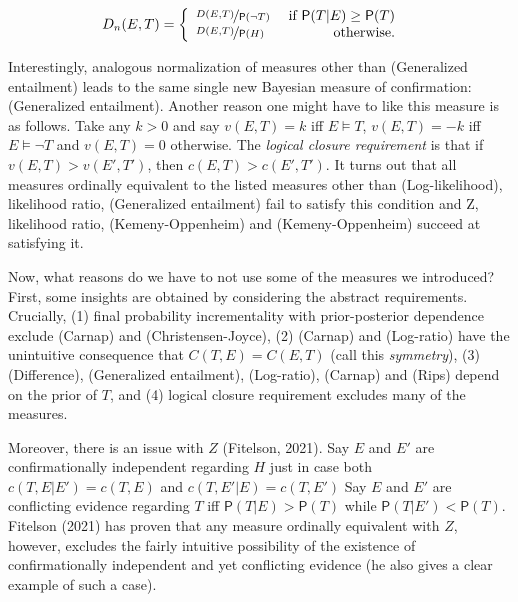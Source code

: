 \documentclass[10pt,dvipsnames,enabledeprecatedfontcommands]{scrartcl}
\newcommand{\n}{\neg}
\newcommand{\pr}[1]{\mathsf{P}(#1)}
\begin{document}
\begin{align*}
D_n(E,T)  & = \left\{ \begin{array}{lr}
\nicefrac{D(E,T)}{\pr{\n T}} & \mbox{ if } \pr{T\vert E} \geq \pr{T}\\
\nicefrac{D(E,T)}{\pr{H}} &\mbox { otherwise.}\\
\end{array} \right.
\end{align*}

Interestingly, analogous normalization of measures other than
(Generalized entailment) leads to the same single new Bayesian measure
of confirmation: (Generalized entailment). Another reason one might have
to like this measure is as follows. Take any \(k > 0\) and say
\(v(E,T) =k\) iff \(E\models T\), \(v(E,T) = -k\) iff \(E \models \n T\)
and \(v(E,T)=0\) otherwise. The \emph{logical closure requirement} is
that if \(v(E,T) > v(E', T')\), then \(c(E, T) > c(E' , T' )\). It turns
out that all measures ordinally equivalent to the listed measures other
than (Log-likelihood), likelihood ratio, (Generalized entailment) fail
to satisfy this condition and Z, likelihood ratio, (Kemeny-Oppenheim)
and (Kemeny-Oppenheim) succeed at satisfying it.

Now, what reasons do we have to not use some of the measures we
introduced? First, some insights are obtained by considering the
abstract requirements. Crucially, (1) final probability incrementality
with prior-posterior dependence exclude (Carnap) and
(Christensen-Joyce), (2) (Carnap) and (Log-ratio) have the unintuitive
consequence that \(C(T,E)= C(E,T)\) (call this \emph{symmetry}), (3)
(Difference), (Generalized entailment), (Log-ratio), (Carnap) and (Rips)
depend on the prior of \(T\), and (4) logical closure requirement
excludes many of the measures.

Moreover, there is an issue with \(Z\) (Fitelson, 2021). Say \(E\) and
\(E'\) are confirmationally independent regarding \(H\) just in case
both \(c(T, E \vert E' ) = c(T, E )\) and
\(c(T, E' \vert E ) = c(T, E')\) Say \(E\) and \(E'\) are conflicting
evidence regarding \(T\) iff \(\pr{T\vert E}> \pr{T}\) while
\(\pr{T\vert E'} < \pr{T}\). Fitelson (2021) has proven that any measure
ordinally equivalent with \(Z\), however, excludes the fairly intuitive
possibility of the existence of confirmationally independent and yet
conflicting evidence (he also gives a clear example of such a case).
\end{document}
